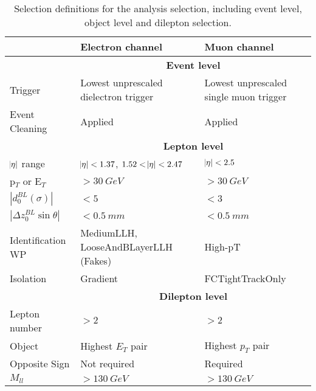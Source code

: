 \begin{table}[h]
    \centering
    {\begin{tabular}{l|p{5cm}|p{5cm}}
        & \textbf{Electron channel} & \textbf{Muon channel} \\
        \hline
        & \multicolumn{2}{c}{\textbf{Event level}} \\
        \hline
        Trigger & Lowest unprescaled \newline dielectron trigger & Lowest unprescaled \newline single muon trigger \\
        \hline
        Event Cleaning & Applied & Applied \\
        \hline
        & \multicolumn{2}{c}{\textbf{Lepton level}} \\
        \hline
        $\abs{\eta}$ range & $\abs{\eta} < 1.37$, $1.52 < \abs{\eta} < 2.47$ & $\abs{\eta} < 2.5$\\
        \hline
        p$_T$ or E$_T$ & $> 30~GeV$ &  $> 30~GeV$ \\
        \hline
        $|d_{0}^{BL}(\sigma)|$ & $< 5$  & $< 3$\\ 
        \hline
        $|\Delta z_{0}^{BL} \sin{\theta}|$ & $< 0.5~mm$ & $< 0.5~mm$ \\
        \hline
        Identification WP & MediumLLH, \newline LooseAndBLayerLLH (Fakes) & High-pT \\
        \hline
        Isolation & Gradient & FCTightTrackOnly \\
        \hline
        & \multicolumn{2}{c}{\textbf{Dilepton level}} \\
        \hline
        Lepton number & $>2$ & $>2$  \\
        \hline
        Object & Highest $E_T$ pair & Highest $p_T$ pair \\
        \hline
        Opposite Sign & Not required & Required \\
        \hline
        $M_{ll}$ & $> 130~GeV$ & $> 130~GeV$ \\

	\end{tabular}}
    \caption[Selection definitions for the analysis selection]{Selection definitions for the analysis selection, including event level, object level and dilepton selection.}
    \label{tab:sel}
  \end{table}

  \clearpage